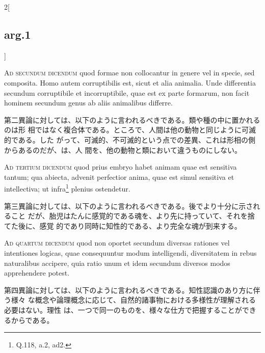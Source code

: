 \documentclass[paper=a4paper,fontsize=10pt,jafontsize=9pt,titlepage]{jlreq}
\begin{document}
\begin{paracol}{2}[\subsection{arg.1}]
\switchcolumn*[\subsection{ad 2}]



{\scshape Ad secundum dicendum} quod formae non collocantur in genere vel in
specie, sed composita. Homo autem corruptibilis est, sicut et alia
animalia. Unde differentia secundum corruptibile et incorruptibile, quae est ex
parte formarum, non facit hominem secundum genus ab aliis animalibus differre.

 \switchcolumn

 第二異論に対しては、以下のように言われるべきである。類や種の中に置かれるのは形
 相ではなく複合体である。ところで、人間は他の動物と同じように可滅的である。した
 がって、可滅的、不可滅的という点での差異、これは形相の側からあるのだが、は、人
 間を、他の動物と類において違うものにしない。
 
\switchcolumn*[\subsection{ad 3}]


{\scshape Ad tertium dicendum} quod prius embryo habet animam quae est sensitiva
tantum; qua abiecta, advenit perfectior anima, quae est simul sensitiva et
intellectiva; ut infra\footnote{Q.118, a.2, ad2.} plenius ostendetur.

\switchcolumn

 第三異論に対しては、以下のように言われるべきである。後でより十分に示されること
 だが、胎児はたんに感覚的である魂を、より先に持っていて、それを捨てた後に、感覚
 的であり同時に知性的である、より完全な魂が到来する。
 
\switchcolumn*[\subsection{ad 4}]



{\scshape Ad quartum dicendum} quod non oportet secundum diversas rationes vel
intentiones logicas, quae consequuntur modum intelligendi, diversitatem in rebus
naturalibus accipere, quia ratio unum et idem secundum diversos modos
apprehendere potest.

 \switchcolumn

 第四異論に対しては、以下のように言われるべきである。知性認識のあり方に伴う様々
な概念や論理概念に応じて、自然的諸事物における多様性が理解される必要はない。理性
は、一つで同一のものを、様々な仕方で把握することができるからである。


\end{paracol}
\end{document}
